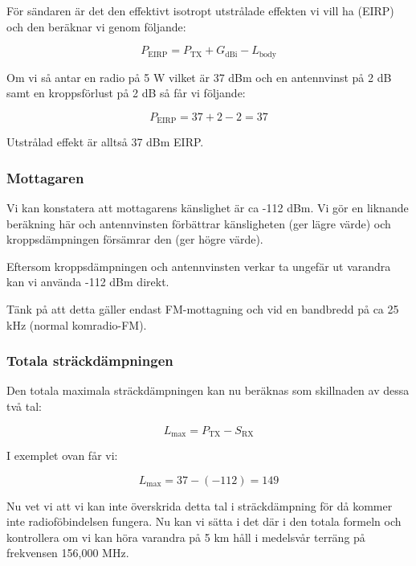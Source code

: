 För sändaren är det den effektivt isotropt utstrålade effekten vi vill ha (EIRP) och den beräknar vi genom följande:

\begin{equation}
P_{\mathrm{EIRP}}=P_{\mathrm{TX}} + G_{\mathrm{dBi}} - L_{\mathrm{body}}
\end{equation}

Om vi så antar en radio på 5 W vilket är 37 dBm och en antennvinst på 2 dB samt en kroppsförlust på 2 dB så får vi följande:

\begin{equation}
P_{\mathrm{EIRP}}=37 + 2 - 2 = 37
\end{equation}

Utstrålad effekt är alltså 37 dBm EIRP.

\subsubsection{Mottagaren}

Vi kan konstatera att mottagarens känslighet är ca -112 dBm. Vi gör en liknande beräkning här och antennvinsten förbättrar känsligheten (ger lägre värde) och kroppsdämpningen försämrar den (ger högre värde). 

Eftersom kroppsdämpningen och antennvinsten verkar ta ungefär ut varandra kan vi använda -112 dBm direkt.

Tänk på att detta gäller endast FM-mottagning och vid en bandbredd på ca 25 kHz (normal komradio-FM).

\subsubsection{Totala sträckdämpningen}

Den totala maximala sträckdämpningen kan nu beräknas som skillnaden av dessa två tal:

\begin{equation}
L_{\mathrm{max}} = P_{\mathrm{TX}} - S_{\mathrm{RX}}
\end{equation}

I exemplet ovan får vi:

\begin{equation}
L_{\mathrm{max}} = 37 - (-112) = 149
\end{equation}

Nu vet vi att vi kan inte överskrida detta tal i sträckdämpning för då kommer inte radioföbindelsen fungera. Nu kan vi sätta i det där i den totala formeln och kontrollera om vi kan höra varandra på 5 km håll i medelsvår terräng på frekvensen 156,000 MHz.

